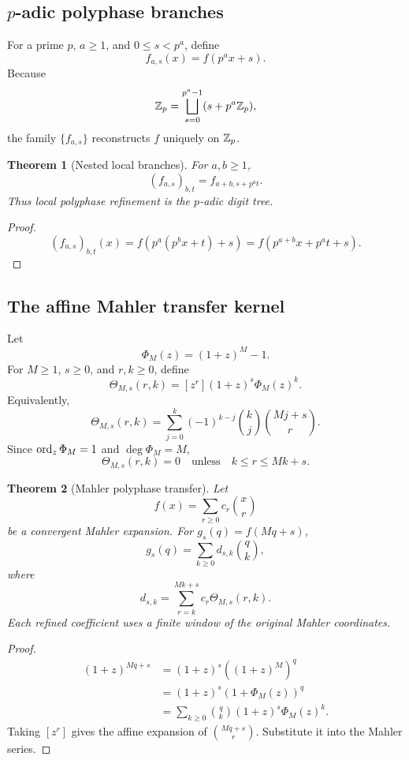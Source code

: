 \documentclass[11pt]{article}
\newtheorem{theorem}{Theorem}[section]\newtheorem{proposition}[theorem]{Proposition}\newtheorem{lemma}[theorem]{Lemma}\newtheorem{corollary}[theorem]{Corollary}
\theoremstyle{definition}\newtheorem{definition}[theorem]{Definition}\newtheorem{example}[theorem]{Example}\newtheorem{construction}[theorem]{Construction}\newtheorem{algorithm}[theorem]{Algorithm}\newtheorem{conjecture}[theorem]{Conjecture}\newtheorem{problem}[theorem]{Problem}
\theoremstyle{remark}\newtheorem{remark}[theorem]{Remark}\newtheorem{boundary}[theorem]{Boundary}\newtheorem{certificate}[theorem]{Computational Certificate}\newtheorem{classical}[theorem]{Classical Input}\newtheorem{principle}[theorem]{Structural Principle}
\begin{document}
\subsection{\texorpdfstring{$p$-adic}{p-adic} polyphase branches}
For a prime $p$, $a\geq1$, and $0\leq s<p^a$, define
\[
 \boxed{f_{a,s}(x)=f(p^ax+s).}
\]
Because
\[
 \mathbb Z_p=\bigsqcup_{s=0}^{p^a-1}(s+p^a\mathbb Z_p),
\]
the family $\{f_{a,s}\}$ reconstructs $f$ uniquely on $\mathbb Z_p$.

\begin{theorem}[Nested local branches]
For $a,b\geq1$,
\[
 \boxed{(f_{a,s})_{b,t}=f_{a+b,s+p^at}.}
\]
Thus local polyphase refinement is the $p$-adic digit tree.
\end{theorem}

\begin{proof}
\[
 (f_{a,s})_{b,t}(x)=f(p^a(p^bx+t)+s)=f(p^{a+b}x+p^at+s).
\]
\end{proof}

\subsection{The affine Mahler transfer kernel}
Let
\[
 \Phi_M(z)=(1+z)^M-1.
\]
For $M\geq1$, $s\geq0$, and $r,k\geq0$, define
\[
 \boxed{\Theta_{M,s}(r,k)=[z^r](1+z)^s\Phi_M(z)^k.}
\]
Equivalently,
\[
 \boxed{\Theta_{M,s}(r,k)=\sum_{j=0}^{k}(-1)^{k-j}\binom kj\binom{Mj+s}{r}.}
\]
Since $\operatorname{ord}_z\Phi_M=1$ and $\deg\Phi_M=M$,
\[
 \boxed{\Theta_{M,s}(r,k)=0\quad\text{unless}\quad k\leq r\leq Mk+s.}
\]

\begin{theorem}[Mahler polyphase transfer]
Let
\[
 f(x)=\sum_{r\geq0}c_r\binom xr
\]
be a convergent Mahler expansion. For $g_s(q)=f(Mq+s)$,
\[
 \boxed{g_s(q)=\sum_{k\geq0}d_{s,k}\binom qk,}
\]
where
\[
 \boxed{d_{s,k}=\sum_{r=k}^{Mk+s}c_r\Theta_{M,s}(r,k).}
\]
Each refined coefficient uses a finite window of the original Mahler coordinates.
\end{theorem}

\begin{proof}
\[
 \begin{aligned}
 (1+z)^{Mq+s}
 &=(1+z)^s\left((1+z)^M\right)^q\\
 &=(1+z)^s(1+\Phi_M(z))^q\\
 &=\sum_{k\geq0}\binom qk(1+z)^s\Phi_M(z)^k.
 \end{aligned}
\]
Taking $[z^r]$ gives the affine expansion of $\binom{Mq+s}{r}$. Substitute it into the Mahler series.
\end{proof}
\end{document}

